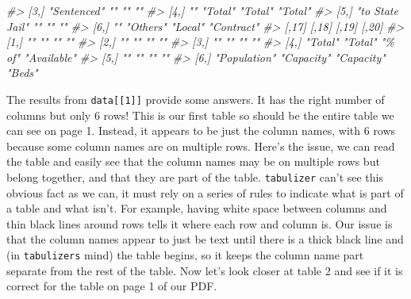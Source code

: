 \documentclass[
  12pt,
  openany]{book}
\newenvironment{Shaded}{\begin{snugshade}}{\end{snugshade}}
\newcommand{\CommentTok}[1]{\textcolor[rgb]{0.37,0.37,0.37}{\textit{#1}}}
\begin{document}
\begin{Shaded}
\begin{Highlighting}[]
\CommentTok{\#\textgreater{} [3,] "Sentenced"     ""       ""      ""        }
\CommentTok{\#\textgreater{} [4,] ""              "Total"  "Total" "Total"   }
\CommentTok{\#\textgreater{} [5,] "to State Jail" ""       ""      ""        }
\CommentTok{\#\textgreater{} [6,] ""              "Others" "Local" "Contract"}
\CommentTok{\#\textgreater{}      [,17]        [,18]      [,19]      [,20]      }
\CommentTok{\#\textgreater{} [1,] ""           ""         ""         ""         }
\CommentTok{\#\textgreater{} [2,] ""           ""         ""         ""         }
\CommentTok{\#\textgreater{} [3,] ""           ""         ""         ""         }
\CommentTok{\#\textgreater{} [4,] "Total"      "Total"    "\% of"     "Available"}
\CommentTok{\#\textgreater{} [5,] ""           ""         ""         ""         }
\CommentTok{\#\textgreater{} [6,] "Population" "Capacity" "Capacity" "Beds"}
\end{Highlighting}
\end{Shaded}

The results from \texttt{data{[}{[}1{]}{]}} provide some answers. It has the right number of columns but only 6 rows! This is our first table so should be the entire table we can see on page 1. Instead, it appears to be just the column names, with 6 rows because some column names are on multiple rows. Here's the issue, we can read the table and easily see that the column names may be on multiple rows but belong together, and that they are part of the table. \texttt{tabulizer} can't see this obvious fact as we can, it must rely on a series of rules to indicate what is part of a table and what isn't. For example, having white space between columns and thin black lines around rows tells it where each row and column is. Our issue is that the column names appear to just be text until there is a thick black line and (in \texttt{tabulizer\textquotesingle{}s} mind) the table begins, so it keeps the column name part separate from the rest of the table. Now let's look closer at table 2 and see if it is correct for the table on page 1 of our PDF.
\end{document}
